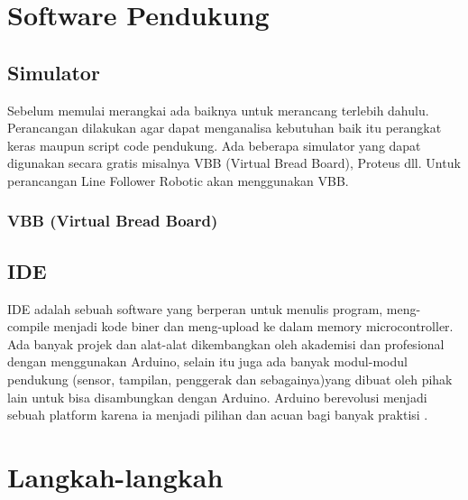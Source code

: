 \section{Software Pendukung}
\subsection{Simulator}
Sebelum memulai merangkai ada baiknya untuk merancang terlebih dahulu. Perancangan dilakukan agar dapat menganalisa kebutuhan baik itu perangkat keras maupun script code pendukung. Ada beberapa simulator yang dapat digunakan secara gratis misalnya VBB (Virtual Bread Board), Proteus dll. Untuk perancangan Line Follower Robotic akan menggunakan VBB.
\subsubsection{VBB (Virtual Bread Board)}


\subsection{IDE}
IDE adalah sebuah software yang berperan untuk menulis program, meng-compile menjadi kode biner dan meng-upload ke dalam memory microcontroller. Ada banyak projek dan alat-alat dikembangkan oleh akademisi dan profesional dengan menggunakan Arduino, selain itu juga ada banyak modul-modul pendukung (sensor, tampilan, penggerak dan sebagainya)yang dibuat oleh pihak lain untuk bisa disambungkan dengan Arduino. Arduino berevolusi menjadi sebuah platform karena ia menjadi pilihan dan acuan bagi banyak praktisi \cite{djuandi2011pengenalan}.

\section{Langkah-langkah} 
